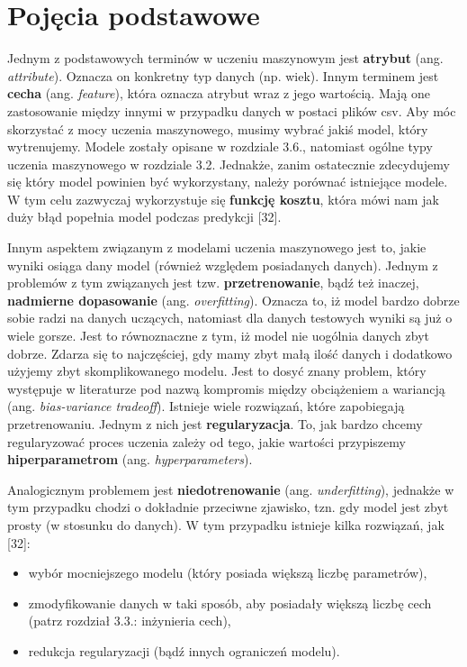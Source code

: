\section{Pojęcia podstawowe}
\label{cha:pojecia}

Jednym z podstawowych terminów w uczeniu maszynowym jest \textbf{atrybut} (ang. \textit{attribute}). Oznacza on konkretny typ danych (np. wiek). Innym terminem jest \textbf{cecha} (ang. \textit{feature}), która oznacza atrybut wraz z jego wartością. Mają one zastosowanie między innymi w przypadku danych w postaci plików csv. Aby móc skorzystać z mocy uczenia maszynowego, musimy wybrać jakiś model, który wytrenujemy. Modele zostały opisane w rozdziale 3.6., natomiast ogólne typy uczenia maszynowego w rozdziale 3.2. Jednakże, zanim ostatecznie zdecydujemy się który model powinien być wykorzystany, należy porównać istniejące modele. W tym celu zazwyczaj wykorzystuje się \textbf{funkcję kosztu}, która mówi nam jak duży błąd popełnia model podczas predykcji [32]. 

Innym aspektem związanym z modelami uczenia maszynowego jest to, jakie wyniki osiąga dany model (również względem posiadanych danych). Jednym z problemów z tym związanych jest tzw. \textbf{przetrenowanie}, bądź też inaczej, \textbf{nadmierne dopasowanie} (ang. \textit{overfitting}). Oznacza to, iż model bardzo dobrze sobie radzi na danych uczących, natomiast dla danych testowych wyniki są już o wiele gorsze. Jest to równoznaczne z tym, iż model nie uogólnia danych zbyt dobrze. Zdarza się to najczęściej, gdy mamy zbyt małą ilość danych i dodatkowo użyjemy zbyt skomplikowanego modelu. Jest to dosyć znany problem, który występuje w literaturze pod nazwą kompromis między obciążeniem a wariancją (ang. \textit{bias-variance tradeoff}). Istnieje wiele rozwiązań, które zapobiegają przetrenowaniu. Jednym z nich jest \textbf{regularyzacja}. To, jak bardzo chcemy regularyzować proces uczenia zależy od tego, jakie wartości przypiszemy \textbf{hiperparametrom} (ang. \textit{hyperparameters}). 

Analogicznym problemem jest \textbf{niedotrenowanie} (ang. \textit{underfitting}), jednakże w tym przypadku chodzi o dokładnie przeciwne zjawisko, tzn. gdy model jest zbyt prosty (w stosunku do danych). W tym przypadku istnieje kilka rozwiązań, jak [32]:
\begin{itemize}
\item
wybór mocniejszego modelu (który posiada większą liczbę parametrów),
\item
zmodyfikowanie danych w taki sposób, aby posiadały większą liczbę cech (patrz rozdział 3.3.: inżynieria cech),
\item
redukcja regularyzacji (bądź innych ograniczeń modelu).
\end{itemize} 
  
